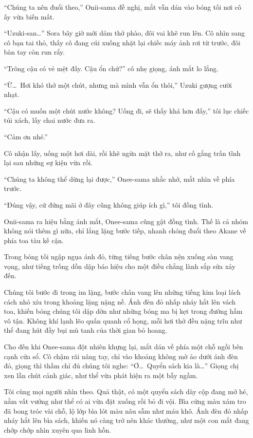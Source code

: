 \documentclass[../main.tex]{subfiles}
\begin{document}
``Chúng ta nên đuổi theo,'' Onii-sama đề nghị, mắt vẫn dán vào bóng tối nơi cô ấy vừa biến mất.

``Uzuki-san\dots'' Sora bây giờ mới dám thở phào, đôi vai khẽ run lên. Cô nhìn sang cô bạn tai thỏ, thấy cô đang cúi xuống nhặt lại chiếc máy ảnh rơi từ trước, đôi bàn tay còn run rẩy.

``Trông cậu có vẻ mệt đấy. Cậu ổn chứ?'' cô nhẹ giọng, ánh mắt lo lắng.

``Ừ\dots\ Hơi khó thở một chút, nhưng mà mình vẫn ổn thôi,'' Uzuki gượng cười nhạt.

``Cậu có muốn một chút nước không? Uống đi, sẽ thấy khá hơn đấy,'' tôi lục chiếc túi xách, lấy chai nước đưa ra.

``Cảm ơn nhé.''

Cô nhận lấy, uống một hơi dài, rồi khẽ ngửa mặt thở ra, như cố gắng trấn tĩnh lại sau những sự kiện vừa rồi.

``Chúng ta không thể dừng lại được,'' Onee-sama nhắc nhở, mắt nhìn về phía trước.

``Đúng vậy, cứ đứng mãi ở đây cũng không giúp ích gì,'' tôi đồng tình.

Onii-sama ra hiệu bằng ánh mắt, Onee-sama cũng gật đồng tình. Thế là cả nhóm không nói thêm gì nữa, chỉ lẳng lặng bước tiếp, nhanh chóng đuổi theo Akane về phía toa tàu kế cận.

Trong bóng tối ngập ngụa ánh đỏ, từng tiếng bước chân nện xuống sàn vang vọng, như tiếng trống dồn dập báo hiệu cho một điều chẳng lành sắp sửa xảy đến.

\ct

Chúng tôi bước đi trong im lặng, bước chân vang lên những tiếng kim loại lách cách nhỏ xíu trong khoảng lặng nặng nề. Ánh đèn đỏ nhấp nháy hắt lên vách toa, khiến bóng chúng tôi dập dờn như những bóng ma bị kẹt trong đường hầm vô tận. Không khí lạnh lẽo quấn quanh cổ họng, mỗi hơi thở đều nặng trĩu như thể đang hút đầy bụi mù tanh của thời gian bỏ hoang.

Cho đến khi Onee-sama đột nhiên khựng lại, mắt dán về phía một chỗ ngồi bên cạnh cửa sổ. Cô chậm rãi nâng tay, chỉ vào khoảng không mờ ảo dưới ánh đèn đỏ, giọng thì thầm chỉ đủ chúng tôi nghe: ``Ơ\dots\ Quyển sách kia là\dots'' Giọng chị xen lẫn chút cảnh giác, như thể vừa phát hiện ra một bẫy ngầm.

Tôi cùng mọi người nhìn theo. Quả thật, có một quyển sách dày cộp đang mở hé, nằm vất vưởng như thể có ai vừa đặt xuống rồi bỏ đi vội. Bìa cứng màu xám tro đã bong tróc vài chỗ, lộ lớp bìa lót màu nâu sẫm như máu khô. Ánh đèn đỏ nhấp nháy hắt lên bìa sách, khiến nó càng trở nên khác thường, như một con mắt đang chớp chớp nhìn xuyên qua linh hồn.
\end{document}

